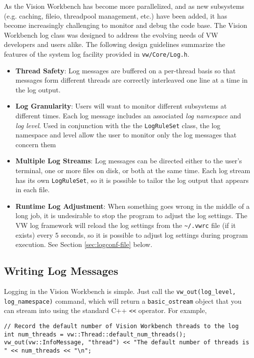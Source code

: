 As the Vision Workbench has become more parallelized, and as new
subsystems (e.g. caching, fileio, threadpool management, etc.) have
been added, it has become increasingly challenging to monitor and
debug the code base.  The Vision Workbench log class was designed to
address the evolving needs of VW developers and users alike.  The
following design guidelines summarize the features of the system log
facility provided in \verb#vw/Core/Log.h#.

\begin{itemize}
\item {\bf Thread Safety}: Log messages are buffered on a
  per-thread basis so that messages form different threads are
  correctly interleaved one line at a time in the log output.
\item {\bf Log Granularity}: Users will want to monitor different
  subsystems at different times.  Each log message includes an
  associated {\em log namespace} and {\em log level}.  Used in
  conjunction with the the \verb#LogRuleSet# class, the log namespace
  and level allow the user to monitor only the log messages that
  concern them
\item {\bf Multiple Log Streams}: Log messages can be directed either
  to the user's terminal, one or more files on disk, or both at the
  same time.  Each log stream has its own \verb#LogRuleSet#, so it is
  possible to tailor the log output that appears in each file.
\item {\bf Runtime Log Adjustment}: When something goes wrong in the
  middle of a long job, it is undesirable to stop the program to
  adjust the log settings.  The VW log framework will reload the log
  settings from the \verb#~/.vwrc# file (if it exists) every
  5 seconds, so it is possible to adjust log settings during program
  execution.  See Section \ref{sec:logconf-file} below.
\end{itemize}

\subsection{Writing Log Messages}

Logging in the Vision Workbench is simple.  Just call the
\verb#vw_out(log_level, log_namespace)# command, which will return a
\verb#basic_ostream# object that you can stream into using the standard C++
\verb#<<# operator.  For example,

\begin{verbatim}
// Record the default number of Vision Workbench threads to the log
int num_threads = vw::Thread::default_num_threads();
vw_out(vw::InfoMessage, "thread") << "The default number of threads is " << num_threads << "\n";
\end{verbatim}

